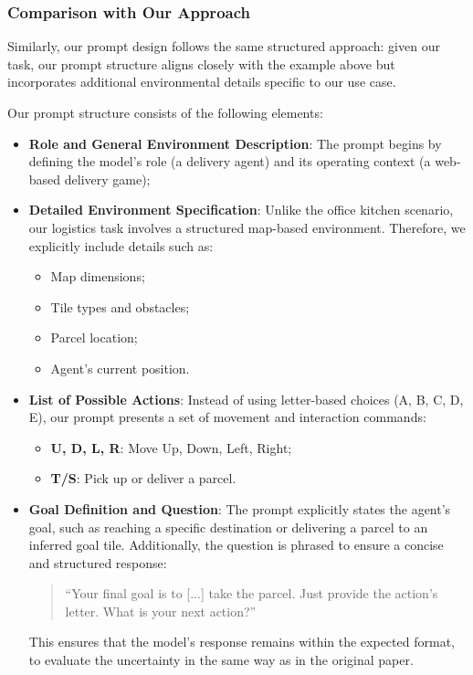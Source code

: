 \subsubsection{Comparison with Our Approach}

Similarly, our prompt design follows the same structured approach: given our
task, our prompt structure aligns closely with the example above but incorporates
additional environmental details specific to our use case.

Our prompt structure consists of the following elements:

\begin{itemize}
  \item \textbf{Role and General Environment Description}: The prompt begins by defining
    the model's role (a delivery agent) and its operating context (a web-based
    delivery game);

  \item \textbf{Detailed Environment Specification}: Unlike the office kitchen scenario,
    our logistics task involves a structured map-based environment. Therefore,
    we explicitly include details such as:
    \begin{itemize}
      \item Map dimensions;

      \item Tile types and obstacles;

      \item Parcel location;

      \item Agent's current position.
    \end{itemize}

  \item \textbf{List of Possible Actions}: Instead of using letter-based choices
    (A, B, C, D, E), our prompt presents a set of movement and interaction
    commands:
    \begin{itemize}
      \item \textbf{U, D, L, R}: Move Up, Down, Left, Right;

      \item \textbf{T/S}: Pick up or deliver a parcel.
    \end{itemize}

  \item \textbf{Goal Definition and Question}: The prompt explicitly states the agent's
    goal, such as reaching a specific destination or delivering a parcel to an
    inferred goal tile. Additionally, the question is phrased to ensure a
    concise and structured response:
    \begin{quote}
      ``Your final goal is to [...] take the parcel. Just provide the action's
      letter. What is your next action?''
    \end{quote}
    This ensures that the model's response remains within the expected format,
    to evaluate the uncertainty in the same way as in the original paper.
\end{itemize}

